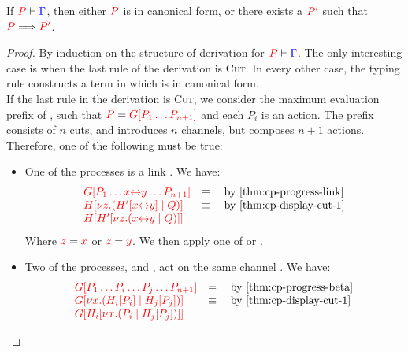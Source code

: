 \begin{theorem}[Progress]\label{thm:cp-progress-3}
  If $\seq[{ P }]{ \Gamma }$, then either $\tm{P}$ is in canonical form, or
  there exists a $\tm{P'}$ such that $\reducesto{P}{P'}$. 
\end{theorem}
\begin{proof}
  By induction on the structure of derivation for $\seq[{ P }]{ \Gamma }$.
  The only interesting case is when the last rule of the derivation is
  \textsc{Cut}. In every other case, the typing rule constructs a term in which
  is in canonical form. 
  \\
  If the last rule in the derivation is \textsc{Cut}, we consider the maximum
  evaluation prefix  of , such that $\tm{P} = \tm{\cpPlug{G}{P_1
  \dots P_{n+1}}}$ and each $P_i$ is an action.
  The prefix  consists of $n$ cuts, and introduces $n$ channels, but
  composes $n+1$ actions. Therefore, one of the following must be true:
  \begin{itemize}
  \item
    One of the processes is a link .
    We have:
    \begin{gather*}
      \begin{array}{ll}
        \tm{\cpPlug{G}{P_1 \dots \cpLink{x}{y} \dots P_{n+1}}}
        & \equiv \quad \text{by \cref{thm:cp-progress-link}}
        \\
        \tm{\cpPlug{H}{\cpCut{z}{\cpPlug{H'}{\cpLink{x}{y}}}{Q}}}
        & \equiv \quad \text{by \cref{thm:cp-display-cut-1}}
        \\
        \tm{\cpPlug{H}{\cpPlug{H'}{\cpCut{z}{\cpLink{x}{y}}{Q}}}}
      \end{array}
    \end{gather*}
    Where $\tm{z} = \tm{x}$ or $\tm{z} = \tm{y}$.
    We then apply one of  or .
  \item
    Two of the processes,  and , act on the same channel .
    We have:
    \begin{gather*}
      \begin{array}{ll}
        \tm{\cpPlug{G}{P_1 \dots P_i \dots P_j \dots P_{n+1}}}
        & = \quad \text{by \cref{thm:cp-progress-beta}}
        \\
        \tm{\cpPlug{G}{\cpCut{x}{\cpPlug{H_i}{P_i}}{\cpPlug{H_j}{P_j}}}}
        & \equiv \quad \text{by \cref{thm:cp-display-cut-1}} 
        \\
        \tm{\cpPlug{G}{\cpPlug{H_i}{\cpCut{x}{P_i}{\cpPlug{H_j}{P_j}}}}}

\end{array}
\end{gather*}
\end{itemize}
\end{proof}
